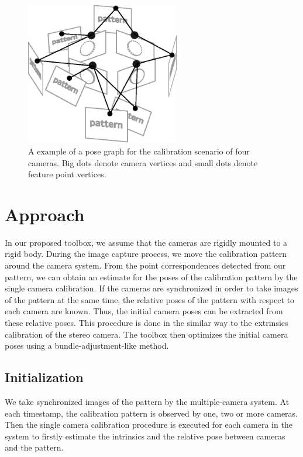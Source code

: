 \documentclass{report}
\begin{document}
\begin{figure}
\centering
\includegraphics[width=0.6\textwidth]{images/graphsample}
\caption{A example of a pose graph for the calibration scenario of four cameras. Big dots denote camera vertices and small dots denote feature point vertices.}
\label{graphSampleFig}
\end{figure}


\section{Approach}
In our proposed toolbox, we assume that the cameras are rigidly mounted to a rigid body. During the image capture process, we move the calibration pattern around the camera system. From the point correspondences detected from our pattern, we can obtain an estimate for the poses of the calibration pattern by the single camera calibration. If the cameras are synchronized in order to take images of the pattern at the same time, the relative poses of the pattern with respect to each camera are known. Thus, the initial camera poses can be extracted from these relative poses. This procedure is done in the similar way to the extrinsics calibration of the stereo camera. The toolbox then optimizes the initial camera poses using a bundle-adjustment-like method. 

\subsection{Initialization}
We take synchronized images of the pattern by the multiple-camera system. At each timestamp, the calibration pattern is observed by one, two or more cameras. Then the single camera calibration procedure is executed for each camera in the system to firstly estimate the intrinsics and the relative pose between cameras and the pattern. 
\end{document}
